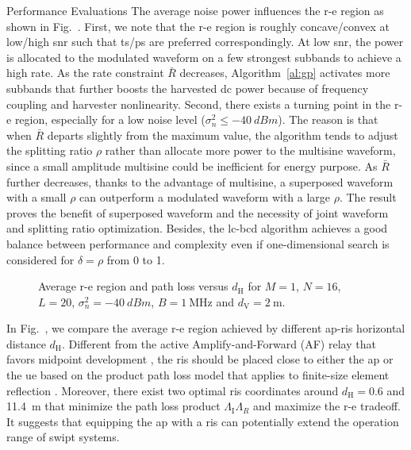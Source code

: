\begin{section}{Performance Evaluations}
	The average noise power influences the \gls{r-e} region as shown in Fig.~. First, we note that the \gls{r-e} region is roughly concave/convex at low/high \gls{snr} such that \gls{ts}/\gls{ps} are preferred correspondingly. At low \gls{snr}, the power is allocated to the modulated waveform on a few strongest subbands to achieve a high rate. As the rate constraint $\bar{R}$ decreases, Algorithm~\ref{al:gp} activates more subbands that further boosts the harvested \gls{dc} power because of frequency coupling and harvester nonlinearity. Second, there exists a turning point in the \gls{r-e} region, especially for a low noise level ($\sigma_n^2 \le \qty{-40}{dBm}$). The reason is that when $\bar{R}$ departs slightly from the maximum value, the algorithm tends to adjust the splitting ratio $\rho$ rather than allocate more power to the multisine waveform, since a small amplitude multisine could be inefficient for energy purpose. As $\bar{R}$ further decreases, thanks to the advantage of multisine, a superposed waveform with a small $\rho$ can outperform a modulated waveform with a large $\rho$. The result proves the benefit of superposed waveform and the necessity of joint waveform and splitting ratio optimization. Besides, the \gls{lc}-\gls{bcd} algorithm achieves a good balance between performance and complexity even if one-dimensional search is considered for $\delta=\rho$ from \num{0} to \num{1}.

	\begin{figure}[!t]
		\centering
		\caption{Average \gls{r-e} region and path loss versus $d_{\mathrm{H}}$ for $M=1$, $N=16$, $L=20$, $\sigma_n^2=\qty{-40}{dBm}$, $B=\qty{1}{\MHz}$ and $d_{\mathrm{V}}=\qty{2}{\meter}$.}
	\end{figure}

	In Fig.~, we compare the average \gls{r-e} region achieved by different \gls{ap}-\gls{ris} horizontal distance $d_{\mathrm{H}}$. Different from the active Amplify-and-Forward (AF) relay that favors midpoint development \cite{Li2017}, the \gls{ris} should be placed close to either the \gls{ap} or the \gls{ue} based on the product path loss model that applies to finite-size element reflection \cite{Ozdogan2020,Tang2021}. Moreover, there exist two optimal \gls{ris} coordinates around $d_{\mathrm{H}}=0.6$ and \qty{11.4}{\meter} that minimize the path loss product $\Lambda_{\mathrm{I}}\Lambda_R$ and maximize the \gls{r-e} tradeoff. It suggests that equipping the \gls{ap} with a \gls{ris} can potentially extend the operation range of \gls{swipt} systems.


\end{section}

